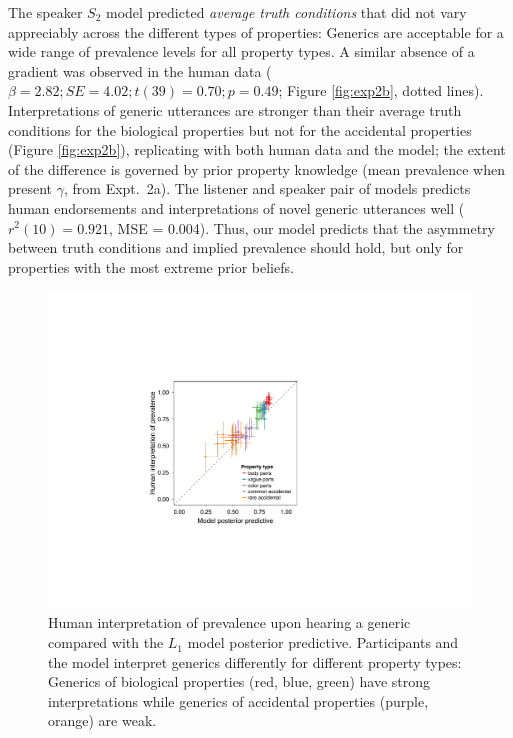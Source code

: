 \documentclass[12pt,letterpaper]{article}
\begin{document}
The speaker $S_2$ model predicted \emph{average truth conditions} that did not vary appreciably across the different types of properties:
Generics are acceptable for a wide range of prevalence levels for all property types.
A similar absence of a gradient was observed in the human data ($\beta = 2.82; SE = 4.02; t(39) = 0.70; p = 0.49$; Figure \ref{fig:exp2b}, dotted lines). 
Interpretations of generic utterances are stronger than their average truth conditions for the biological properties but not for the accidental properties (Figure \ref{fig:exp2b}), replicating  with both human data and the model; the extent of the difference is governed by prior property knowledge (mean prevalence when present $\gamma$, from Expt.~2a).
The listener and speaker pair of models predicts human endorsements and interpretations of novel generic utterances well ($r^2(10) = 0.921$, MSE = 0.004).
Thus, our model predicts that the asymmetry between truth conditions and implied prevalence should hold, but only for properties with the most extreme prior beliefs.

\begin{figure}
\centering
    \includegraphics[width=0.5\columnwidth]{implied-byItem-mh100kX2b.pdf}
    \caption{Human interpretation of prevalence upon hearing a generic compared with the $L_1$ model posterior predictive. 
    Participants and the model interpret generics differently for different property types: Generics of biological properties (red, blue, green) have  strong interpretations while generics of accidental properties (purple, orange) are weak.}
  \label{fig:impliedByItem}
\end{figure}
\end{document}
